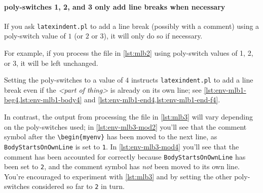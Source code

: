  \paragraph{poly-switches 1, 2, and 3 only add line breaks when necessary}
  If you ask \texttt{latexindent.pl} to add a line break (possibly with a comment) using a
  poly-switch value of $1$ (or $2$ or $3$), it will only do so if necessary.

  \begin{example}
  For example, if you process the file in \vref{lst:mlb2} using poly-switch values of 1, 2,
  or 3, it will be left unchanged.

  \begin{cmhtcbraster}
  \end{cmhtcbraster}
  \end{example}

  Setting the poly-switches to a value of $4$ instructs \texttt{latexindent.pl} to add a
  line break even if the \emph{<part of thing>} is already on its own line; see
  \cref{lst:env-mlb1-beg4,lst:env-mlb1-body4} and
  \cref{lst:env-mlb1-end4,lst:env-mlb1-end-f4}.

  \begin{example}
  In contrast, the output from processing the file in \cref{lst:mlb3} will vary depending
  on the poly-switches used; in \cref{lst:env-mlb3-mod2} you'll see that the comment symbol
  after the \lstinline!\begin{myenv}! has been moved to the next line, as
  \texttt{BodyStartsOnOwnLine} is set to \texttt{1}. In \cref{lst:env-mlb3-mod4} you'll see
  that the comment has been accounted for correctly because \texttt{BodyStartsOnOwnLine}
  has been set to \texttt{2}, and the comment symbol has \emph{not} been moved to its own
  line. You're encouraged to experiment with \cref{lst:mlb3} and by setting the other
  poly-switches considered so far to \texttt{2} in turn.

  \begin{cmhtcbraster}[raster column skip=.1\linewidth]
  \end{cmhtcbraster}
  \end{example}

